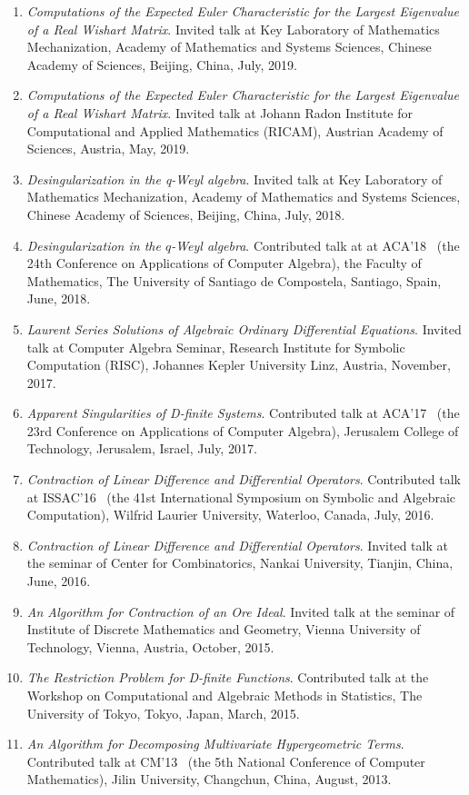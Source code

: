 \documentclass[a4paper,12pt]{article}
\begin{document}
\begin{enumerate}
\item {\em Computations of the Expected Euler Characteristic for the Largest Eigenvalue of a Real Wishart Matrix}.
Invited talk at Key Laboratory of Mathematics Mechanization, Academy of Mathematics and Systems Sciences,
 Chinese Academy of Sciences, Beijing, China, July, 2019. 
\item {\em Computations of the Expected Euler Characteristic for the Largest Eigenvalue of a Real Wishart Matrix}.
Invited talk at Johann Radon Institute for Computational and Applied Mathematics (RICAM), Austrian Academy of Sciences, 
Austria, May, 2019.
 \item {\em Desingularization in the q-Weyl algebra}. 
 Invited talk at Key Laboratory of Mathematics Mechanization, Academy of Mathematics and Systems Sciences,
 Chinese Academy of Sciences, Beijing, China, July, 2018. 
 \item {\em Desingularization in the $q$-Weyl algebra}. 
 Contributed talk at at ACA'18 
 \ (the 24th Conference on Applications of Computer Algebra), the Faculty of Mathematics, 
 The University of Santiago de Compostela, Santiago, Spain, June, 2018.
 \item {\em Laurent Series Solutions of Algebraic Ordinary Differential Equations}. 
 Invited talk at Computer Algebra Seminar, Research Institute for Symbolic Computation (RISC), Johannes Kepler University Linz, 
 Austria, November, 2017.
 \item {\em Apparent Singularities of D-finite Systems}. Contributed talk at ACA'17 
 \ (the 23rd Conference on Applications of Computer Algebra), Jerusalem College of Technology, Jerusalem, Israel, July, 2017.
 \item {\em Contraction of Linear Difference and Differential Operators}. Contributed talk at ISSAC'16 
 \ (the 41st International Symposium on Symbolic and Algebraic Computation), Wilfrid Laurier University, Waterloo, Canada, July, 2016.
 \item {\em Contraction of Linear Difference and Differential Operators}.
       Invited talk at the seminar of Center for Combinatorics, Nankai University, Tianjin, China, June, 2016.
 \item {\em An Algorithm for Contraction of an Ore Ideal}. Invited talk at the seminar of Institute of Discrete Mathematics and Geometry, 
       Vienna University of Technology, Vienna, Austria, October, 2015.
 \item {\em The Restriction Problem for D-finite Functions}. 
       Contributed talk at the Workshop on Computational and Algebraic Methods in Statistics,
       The University of Tokyo, Tokyo, Japan, March, 2015.
 \item {\em An Algorithm for Decomposing Multivariate Hypergeometric Terms}. Contributed talk at CM'13
       \ (the 5th National Conference of Computer Mathematics), Jilin University, Changchun, China, August, 2013.
\end{enumerate}
\end{document}
